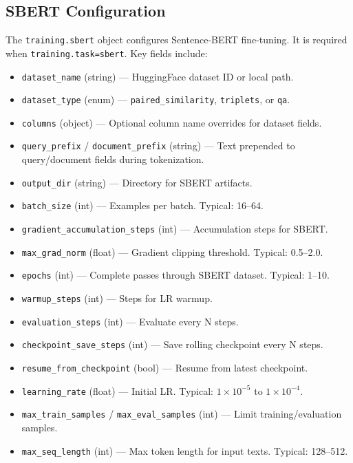 \subsection{SBERT Configuration}
\label{subsec:sbert-config}

The \texttt{training.sbert} object configures Sentence-BERT fine-tuning. It is required when \texttt{training.task=sbert}. Key fields include:

\begin{itemize}[nosep]
    \item \texttt{dataset\_name} (string) --- HuggingFace dataset ID or local path.
    \item \texttt{dataset\_type} (enum) --- \texttt{paired\_similarity}, \texttt{triplets}, or \texttt{qa}.
    \item \texttt{columns} (object) --- Optional column name overrides for dataset fields.
    \item \texttt{query\_prefix} / \texttt{document\_prefix} (string) --- Text prepended to query/document fields during tokenization.
    \item \texttt{output\_dir} (string) --- Directory for SBERT artifacts.
    \item \texttt{batch\_size} (int) --- Examples per batch. Typical: 16--64.
    \item \texttt{gradient\_accumulation\_steps} (int) --- Accumulation steps for SBERT.
    \item \texttt{max\_grad\_norm} (float) --- Gradient clipping threshold. Typical: 0.5--2.0.
    \item \texttt{epochs} (int) --- Complete passes through SBERT dataset. Typical: 1--10.
    \item \texttt{warmup\_steps} (int) --- Steps for LR warmup.
    \item \texttt{evaluation\_steps} (int) --- Evaluate every N steps.
    \item \texttt{checkpoint\_save\_steps} (int) --- Save rolling checkpoint every N steps.
    \item \texttt{resume\_from\_checkpoint} (bool) --- Resume from latest checkpoint.
    \item \texttt{learning\_rate} (float) --- Initial LR. Typical: $1\times10^{-5}$ to $1\times10^{-4}$.
    \item \texttt{max\_train\_samples} / \texttt{max\_eval\_samples} (int) --- Limit training/evaluation samples.
    \item \texttt{max\_seq\_length} (int) --- Max token length for input texts. Typical: 128--512.

\end{itemize}
